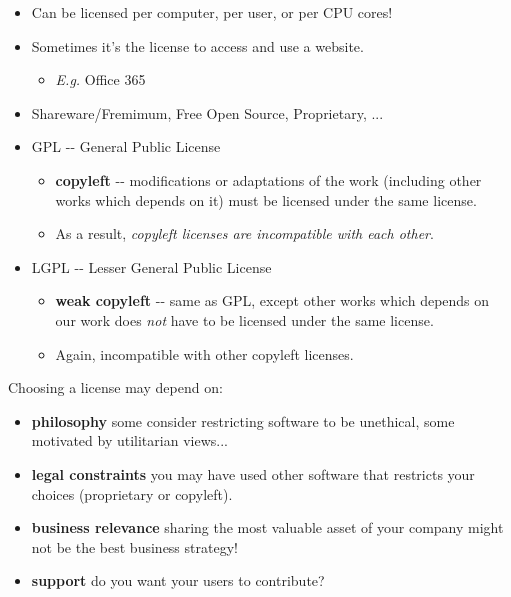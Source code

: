 \documentclass[a4paper]{article}
\providecommand{\tightlist}{%
  \setlength{\itemsep}{0pt}\setlength{\parskip}{0pt}}
\begin{document}
\begin{itemize}
\tightlist
\item
  Can be licensed per computer, per user, or per CPU cores!
\item
  Sometimes it's the license to access and use a website.

  \begin{itemize}
  \tightlist
  \item
    \emph{E.g.} Office 365
  \end{itemize}
\item
  Shareware/Fremimum, Free Open Source, Proprietary, ...
\item
  GPL -\/- General Public License

  \begin{itemize}
  \tightlist
  \item
    \textbf{copyleft} -\/- modifications or adaptations of the work
    (including other works which depends on it) must be licensed under
    the same license.
  \item
    As a result, \emph{copyleft licenses are incompatible with each
    other}.
  \end{itemize}
\item
  LGPL -\/- Lesser General Public License

  \begin{itemize}
  \tightlist
  \item
    \textbf{weak copyleft} -\/- same as GPL, except other works which
    depends on our work does \emph{not} have to be licensed under the
    same license.
  \item
    Again, incompatible with other copyleft licenses.
  \end{itemize}
\end{itemize}

Choosing a license may depend on:

\begin{itemize}
\tightlist
\item
  \textbf{philosophy} some consider restricting software to be
  unethical, some motivated by utilitarian views...
\item
  \textbf{legal constraints} you may have used other software that
  restricts your choices (proprietary or copyleft).
\item
  \textbf{business relevance} sharing the most valuable asset of your
  company might not be the best business strategy!
\item
  \textbf{support} do you want your users to contribute?
\end{itemize}
\end{document}

